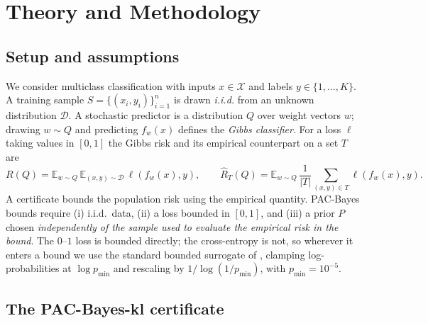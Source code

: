 \section{Theory and Methodology}\label{sec:theory}

\subsection{Setup and assumptions}\label{sec:assumptions}

We consider multiclass classification with inputs $x\in\mathcal{X}$ and labels
$y\in\{1,\dots,K\}$. A training sample $S=\{(x_i,y_i)\}_{i=1}^{n}$ is drawn
\emph{i.i.d.} from an unknown distribution $\mathcal{D}$. A stochastic predictor
is a distribution $Q$ over weight vectors $w$; drawing $w\sim Q$ and predicting
$f_w(x)$ defines the \emph{Gibbs classifier}. For a loss $\ell$ taking values in
$[0,1]$ the Gibbs risk and its empirical counterpart on a set $T$ are
\begin{equation}\label{eq:risk}
R(Q)=\mathbb{E}_{w\sim Q}\,\mathbb{E}_{(x,y)\sim\mathcal{D}}\,\ell(f_w(x),y),
\qquad
\hat{R}_T(Q)=\mathbb{E}_{w\sim Q}\,\frac{1}{|T|}\sum_{(x,y)\in T}\ell(f_w(x),y).
\end{equation}
A certificate bounds the population risk using the empirical quantity.
PAC-Bayes bounds require (i) i.i.d.\ data, (ii) a loss bounded in $[0,1]$, and
(iii) a prior $P$ chosen \emph{independently of the sample used to evaluate the
empirical risk in the bound}. The $0$--$1$ loss is bounded directly; the
cross-entropy is not, so wherever it enters a bound we use the standard bounded
surrogate of \textcite{dziugaite2017}, clamping log-probabilities at
$\log p_{\min}$ and rescaling by $1/\log(1/p_{\min})$, with $p_{\min}=10^{-5}$.

\subsection{The PAC-Bayes-kl certificate}\label{sec:pbkl}

